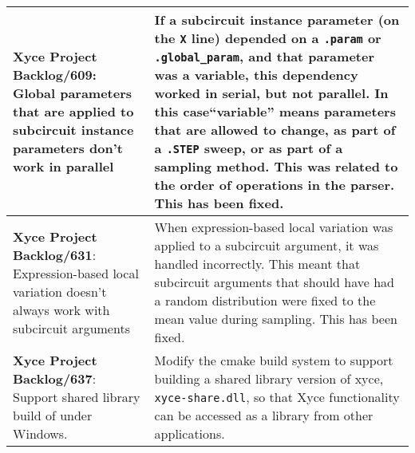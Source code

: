{\begin{longtable}[h] {>{\raggedright\small}m{2in}|>{\raggedright\let\\\tabularnewline\small}m{3.5in}}
 \textbf{Xyce Project Backlog/609}: 
  Global parameters that are applied to subcircuit instance parameters don't work in parallel
  & 
  If a subcircuit instance parameter (on the \texttt{X} line) depended on a \texttt{.param} or \texttt{.global\_param}, 
  and that parameter was a variable, this dependency worked in serial, but not parallel.    In this case``variable'' means 
  parameters that are allowed to change, as part of a \texttt{.STEP} sweep, or as part of a sampling method.
  This was related to the order of operations in the parser.  This has been fixed.  \\ \hline

 \textbf{Xyce Project Backlog/631}: 
  Expression-based local variation doesn't always work with subcircuit arguments & 
  When expression-based local variation was applied to a subcircuit argument, it 
  was handled incorrectly.  This meant that subcircuit arguments that should have 
  had a random distribution were fixed to the mean value during sampling.  
  This has been fixed.  \\ \hline

  \textbf{Xyce Project Backlog/637}: Support shared library build of \Xyce{} under Windows.
  &  Modify the cmake build system to support building a shared library version of xyce, \texttt{xyce-share.dll}, so that 
  Xyce functionality can be accessed as a library from other applications.
  \\\hline


\end{longtable}
}
